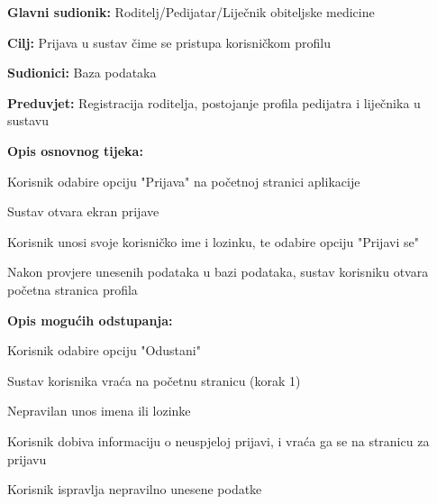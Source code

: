 					\noindent {}
					\begin{packed_item}
						
						\item \textbf{Glavni sudionik: }Roditelj/Pedijatar/Liječnik obiteljske medicine
						\item  \textbf{Cilj:} Prijava u sustav čime se pristupa korisničkom profilu
						\item  \textbf{Sudionici:} Baza podataka
						\item  \textbf{Preduvjet:} Registracija roditelja, postojanje profila pedijatra i liječnika u sustavu
						\item  \textbf{Opis osnovnog tijeka:}
						
						\item[] \begin{packed_enum}
							
							\item Korisnik odabire opciju "Prijava" na početnoj stranici aplikacije
							\item Sustav otvara ekran prijave
							\item Korisnik unosi svoje korisničko ime i lozinku, te odabire opciju "Prijavi se"
							\item Nakon provjere unesenih podataka u bazi podataka, sustav korisniku otvara početna stranica profila
						\end{packed_enum}
						
						\item  \textbf{Opis mogućih odstupanja:}
						
						\item[] \begin{packed_item}
							\item[3.a] Korisnik odabire opciju "Odustani"
							\item[] \begin{packed_enum}
								\item Sustav korisnika vraća na početnu stranicu (korak 1)
							\end{packed_enum}
							\item[4.a] Nepravilan unos imena ili lozinke
							\item[] \begin{packed_enum}
								
								\item Korisnik dobiva informaciju o neuspjeloj prijavi, i vraća ga se na stranicu za prijavu
								\item Korisnik ispravlja nepravilno unesene podatke
								
							\end{packed_enum}
						\end{packed_item}
					\end{packed_item}
					
